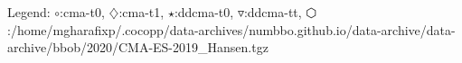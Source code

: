 Legend: {\color{NavyBlue}$\circ$}:cma-t0, {\color{Magenta}$\diamondsuit$}:cma-t1, {\color{Orange}$\star$}:ddcma-t0, {\color{CornflowerBlue}$\triangledown$}:ddcma-tt, {\color{red}$\varhexagon$}:/home/mgharafixp/.cocopp/data-archives/numbbo.github.io/data-archive/data-archive/bbob/2020/CMA-ES-2019\_Hansen.tgz